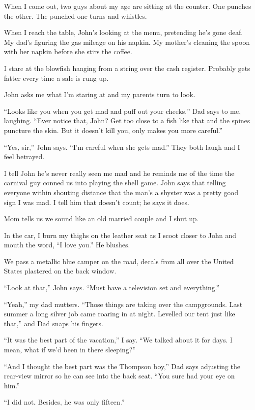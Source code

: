 \documentclass[
]{article}
\begin{document}
When I come out, two guys about my age are sitting at the counter. One
punches the other. The punched one turns and whistles.

When I reach the table, John's looking at the menu, pretending he's gone
deaf. My dad's figur­ing the gas mileage on his napkin. My mother's
cleaning the spoon with her napkin before she stirs the coffee.

I stare at the blowfish hanging from a string over the cash register.
Probably gets fatter every time a sale is rung up.

John asks me what I'm staring at and my parents turn to look.

``Looks like you when you get mad and puff out your cheeks,'' Dad says
to me, laughing. ``Ever notice that, John? Get too close to a fish like
that and the spines puncture the skin. But it doesn't kill you, only
makes you more careful.''

``Yes, sir,'' John says. ``I'm careful when she gets mad.'' They both
laugh and I feel betrayed.

I tell John he's never really seen me mad and he reminds me of the time
the carnival guy conned us into playing the shell game. John says that
telling everyone within shouting distance that the man's a shyster was a
pretty good sign I was mad. I tell him that doesn't count; he says it
does.

Mom tells us we sound like an old married couple and I shut up.

In the car, I burn my thighs on the leather seat as I scoot closer to
John and mouth the word, ``I love you.'' He blushes.

We pass a metallic blue camper on the road, decals from all over the
United States plastered on the back window.

``Look at that,'' John says. ``Must have a television set and
everything.''

``Yeah,'' my dad mutters. ``Those things are taking over the
campgrounds. Last summer a long silver job came roaring in at night.
Levelled our tent just like that,'' and Dad snaps his fingers.

``It was the best part of the vacation,'' I say. ``We talked about it
for days. I mean, what if we'd been in there sleeping?''

``And I thought the best part was the Thompson boy,'' Dad says adjusting
the rear-view mirror so he can see into the back seat. ``You sure had
your eye on him.''

``I did not. Besides, he was only fifteen.''
\end{document}
